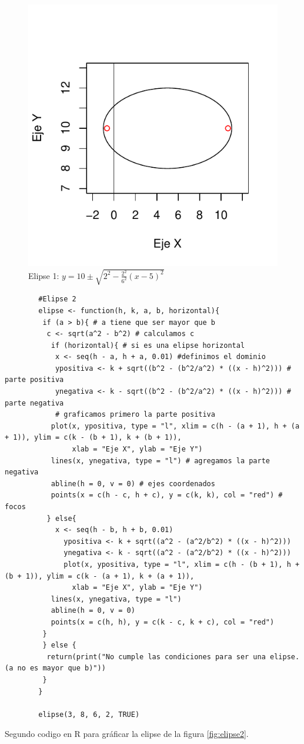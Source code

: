 \documentclass[12pt,a4paper]{article}
\begin{document}
\begin{figure}
\centering
\includegraphics[scale=.8]{ELI1}
\caption{Elipse 1: $ y = 10 \pm \sqrt{2^2 - \frac{2^2}{6^2}(x - 5)^2}  $}
\label{fig:elipse1}
\end{figure}

\begin{table}[htpb]
	\begin{lstlisting}
		#Elipse 2
		elipse <- function(h, k, a, b, horizontal){
 		 if (a > b){ # a tiene que ser mayor que b
  		  c <- sqrt(a^2 - b^2) # calculamos c
 		   if (horizontal){ # si es una elipse horizontal
  		    x <- seq(h - a, h + a, 0.01) #definimos el dominio
  		    ypositiva <- k + sqrt((b^2 - (b^2/a^2) * ((x - h)^2))) # parte positiva
  		    ynegativa <- k - sqrt((b^2 - (b^2/a^2) * ((x - h)^2))) # parte negativa
  		    # graficamos primero la parte positiva
   		   plot(x, ypositiva, type = "l", xlim = c(h - (a + 1), h + (a + 1)), ylim = c(k - (b + 1), k + (b + 1)),
   		        xlab = "Eje X", ylab = "Eje Y")
   		   lines(x, ynegativa, type = "l") # agregamos la parte negativa
   		   abline(h = 0, v = 0) # ejes coordenados
   		   points(x = c(h - c, h + c), y = c(k, k), col = "red") # focos
  		  } else{
  		    x <- seq(h - b, h + b, 0.01)
    		  ypositiva <- k + sqrt((a^2 - (a^2/b^2) * ((x - h)^2)))
    		  ynegativa <- k - sqrt((a^2 - (a^2/b^2) * ((x - h)^2)))
    		  plot(x, ypositiva, type = "l", xlim = c(h - (b + 1), h + (b + 1)), ylim = c(k - (a + 1), k + (a + 1)),
   		        xlab = "Eje X", ylab = "Eje Y")
   		   lines(x, ynegativa, type = "l")
   		   abline(h = 0, v = 0)
   		   points(x = c(h, h), y = c(k - c, k + c), col = "red")
   		 }
 		 } else {
  		  return(print("No cumple las condiciones para ser una elipse. (a no es mayor que b)"))
 		 }
		}
	
		elipse(3, 8, 6, 2, TRUE)
	\end{lstlisting}
	\caption{Segundo codigo en R para gráficar la elipse de la figura \ref{fig:elipse2}.}
	\label{alg:cir1}
\end{table}
\end{document}
